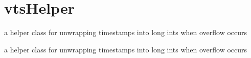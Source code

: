 \hypertarget{group__vtsHelper}{\section{vts\-Helper}
\label{group__vtsHelper}
}


a helper class for unwrapping timestamps into long ints when overflow occurs  


a helper class for unwrapping timestamps into long ints when overflow occurs 